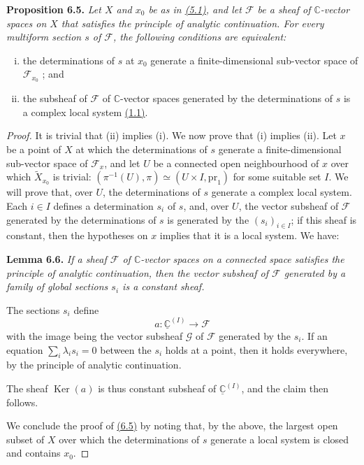 \documentclass{report}
\newenvironment{itenv}[1]
  {\phantomsection\par\medskip\noindent\textbf{#1.}\itshape}
  {\par\medskip}
\newcommand{\scr}[1]{{\mathscr{#1}}}
\newcommand{\CC}{\mathbb{C}}
\newcommand{\pr}{\mathrm{pr}}
\DeclareMathOperator{\Ker}{Ker}
\newcommand{\oldpage}[1]{\marginpar{\footnotesize$\Big\vert$ \textit{p.~#1}}}
\begin{document}
\begin{itenv}{Proposition 6.5}
\label{I.6.5}
  Let $X$ and $x_0$ be as in \hyperref[I.5.1]{(5.1)}, and let $\scr{F}$ be a sheaf of $\CC$-vector spaces on $X$ that satisfies the principle of analytic continuation.
  For every multiform section $s$ of $\scr{F}$, the following conditions are equivalent:
  \begin{enumerate}[(i)]
    \item the determinations of $s$ at $x_0$ generate a finite-dimensional sub-vector space of $\scr{F}_{x_0}$ ; and
    \item the subsheaf of $\scr{F}$ of $\CC$-vector spaces generated by the determinations of $s$ is a complex local system \hyperref[I.1.1]{(1.1)}.
  \end{enumerate}
\end{itenv}

\oldpage{38}
\begin{proof}
  It is trivial that (ii) implies (i).
  We now prove that (i) implies (ii).
  Let $x$ be a point of $X$ at which the determinations of $s$ generate a finite-dimensional sub-vector space of $\scr{F}_x$, and let $U$ be a connected open neighbourhood of $x$ over which $\widetilde{X}_{x_0}$ is trivial: $(\pi^{-1}(U),\pi) \simeq (U\times I,\pr_1)$ for some suitable set $I$.
  We will prove that, over $U$, the determinations of $s$ generate a complex local system.
  Each $i\in I$ defines a determination $s_i$ of $s$, and, over $U$, the vector subsheaf of $\scr{F}$ generated by the determinations of $s$ is generated by the $(s_i)_{i\in I}$;
  if this sheaf is constant, then the hypotheses on $x$ implies that it is a local system.
  We have:

  \begin{itenv}{Lemma 6.6}
  \label{I.6.6}
    If a sheaf $\scr{F}$ of $\CC$-vector spaces on a connected space satisfies the principle of analytic continuation, then the vector subsheaf of $\scr{F}$ generated by a family of global sections $s_i$ is a constant sheaf.
  \end{itenv}

  The sections $s_i$ define
  \[
    a\colon\underline{\CC}^{(I)}\to\scr{F}
  \]
  with the image being the vector subsheaf $\scr{G}$ of $\scr{F}$ generated by the $s_i$.
  If an equation $\sum_i\lambda_i s_i=0$ between the $s_i$ holds at a point, then it holds everywhere, by the principle of analytic continuation.

  The sheaf $\Ker(a)$ is thus constant subsheaf of $\underline{\CC}^{(I)}$, and the claim then follows.

  We conclude the proof of \hyperref[I.6.5]{(6.5)} by noting that, by the above, the largest open subset of $X$ over which the determinations of $s$ generate a local system is closed and contains $x_0$.
\end{proof}
\end{document}
